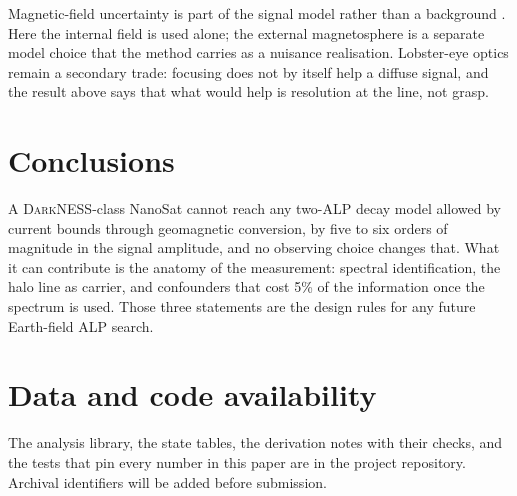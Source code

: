 \documentclass[11pt]{article}
\newcommand{\DarkNESS}{\textsc{DarkNESS}}
\begin{document}
Magnetic-field uncertainty is part of the signal model rather than a background \citep{matthews2022magneticmodels}. Here the internal field is used alone; the external magnetosphere is a separate model choice that the method carries as a nuisance realisation. Lobster-eye optics remain a secondary trade: focusing does not by itself help a diffuse signal, and the result above says that what would help is resolution at the line, not grasp.

\section{Conclusions}
\label{sec:conclusions}

A \DarkNESS{}-class NanoSat cannot reach any two-ALP decay model allowed by current bounds through geomagnetic conversion, by five to six orders of magnitude in the signal amplitude, and no observing choice changes that. What it can contribute is the anatomy of the measurement: spectral identification, the halo line as carrier, and confounders that cost 5\% of the information once the spectrum is used. Those three statements are the design rules for any future Earth-field ALP search.

\section*{Data and code availability}

The analysis library, the state tables, the derivation notes with their checks, and the tests that pin every number in this paper are in the project repository. Archival identifiers will be added before submission.



\end{document}
